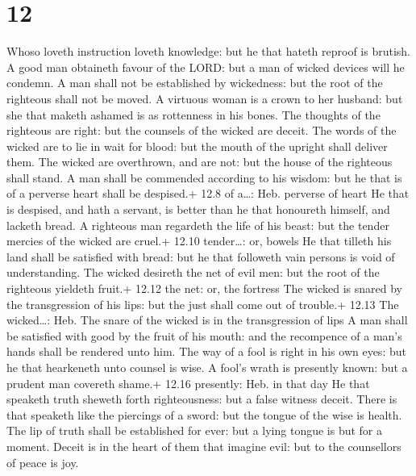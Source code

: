\hypertarget{section-11}{%
\section{12}\label{section-11}}

 Whoso loveth instruction loveth knowledge: but he that
hateth reproof is brutish.  A good man obtaineth favour of
the LORD: but a man of wicked devices will he condemn.  A
man shall not be established by wickedness: but the root of the
righteous shall not be moved.  A virtuous woman is a crown
to her husband: but she that maketh ashamed is as rottenness in his
bones.  The thoughts of the righteous are right: but the
counsels of the wicked are deceit.  The words of the wicked
are to lie in wait for blood: but the mouth of the upright shall deliver
them.  The wicked are overthrown, and are not: but the house
of the righteous shall stand.  A man shall be commended
according to his wisdom: but he that is of a perverse heart shall be
despised.+ 12.8 of a\ldots: Heb. perverse of heart  He that
is despised, and hath a servant, is better than he that honoureth
himself, and lacketh bread.  A righteous man regardeth the
life of his beast: but the tender mercies of the wicked are cruel.+
12.10 tender\ldots: or, bowels  He that tilleth his land
shall be satisfied with bread: but he that followeth vain persons is
void of understanding.  The wicked desireth the net of evil
men: but the root of the righteous yieldeth fruit.+ 12.12 the net: or,
the fortress  The wicked is snared by the transgression of
his lips: but the just shall come out of trouble.+ 12.13 The
wicked\ldots: Heb. The snare of the wicked is in the transgression of
lips  A man shall be satisfied with good by the fruit of
his mouth: and the recompence of a man's hands shall be rendered unto
him.  The way of a fool is right in his own eyes: but he
that hearkeneth unto counsel is wise.  A fool's wrath is
presently known: but a prudent man covereth shame.+ 12.16 presently:
Heb. in that day  He that speaketh truth sheweth forth
righteousness: but a false witness deceit.  There is that
speaketh like the piercings of a sword: but the tongue of the wise is
health.  The lip of truth shall be established for ever:
but a lying tongue is but for a moment.  Deceit is in the
heart of them that imagine evil: but to the counsellors of peace is joy.
